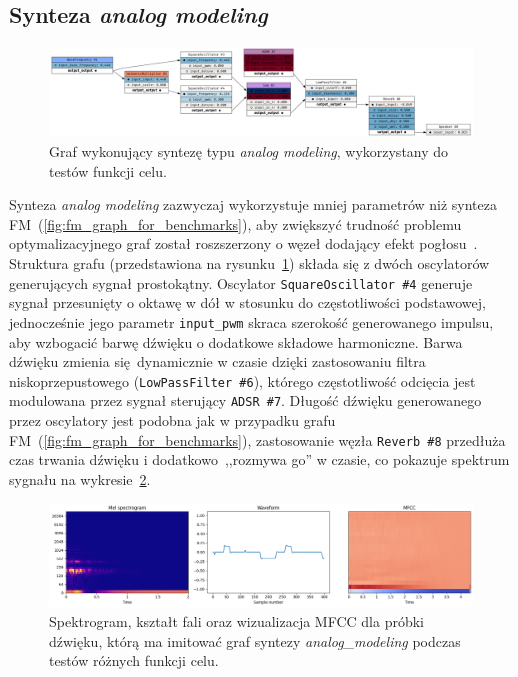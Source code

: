 \subsection{Synteza \textit{analog modeling}}

\begin{figure}[H]
    \centering
    \includegraphics[width=1.0\linewidth]{rys03/analog_graph_for_benchmarks.png}
    \caption{
      Graf wykonujący syntezę typu \textit{analog modeling}, wykorzystany do testów funkcji celu.
    }\label{fig:analog_graph_for_benchmarks}
\end{figure}

Synteza \textit{analog modeling} zazwyczaj wykorzystuje mniej parametrów niż synteza
FM~(\ref{fig:fm_graph_for_benchmarks}), aby zwiększyć trudność problemu optymalizacyjnego
graf został roszszerzony o węzeł dodający efekt pogłosu~\cite{reverb}.
Struktura grafu (przedstawiona na rysunku~\ref{fig:analog_graph_for_benchmarks}) składa
się z dwóch oscylatorów generujących sygnał prostokątny. Oscylator \texttt{SquareOscillator \#4}
generuje sygnał przesunięty o oktawę w dół w stosunku do częstotliwości podstawowej, jednocześnie
jego parametr \texttt{input\_pwm} skraca szerokość generowanego impulsu, aby wzbogacić barwę dźwięku
o dodatkowe składowe harmoniczne. Barwa dźwięku zmienia się dynamicznie w czasie dzięki 
zastosowaniu filtra niskoprzepustowego (\texttt{LowPassFilter \#6}), którego
częstotliwość odcięcia jest modulowana przez sygnał sterujący \texttt{ADSR \#7}.
Długość dźwięku generowanego przez oscylatory jest podobna jak w przypadku
grafu FM~(\ref{fig:fm_graph_for_benchmarks}), zastosowanie węzła \texttt{Reverb \#8}
przedłuża czas trwania dźwięku i dodatkowo~,,rozmywa go'' w czasie, co pokazuje
spektrum sygnału na wykresie~\ref{fig:am_training_sample_overview}.

\begin{figure}[H]
  \centering
  \includegraphics[width=1.0\linewidth]{rys03/am_training_sample_overview.png}
  \caption{
    Spektrogram, kształt fali oraz wizualizacja MFCC dla próbki dźwięku, którą
    ma imitować graf syntezy \textit{analog\_modeling} podczas testów różnych funkcji celu.
  }\label{fig:am_training_sample_overview}
\end{figure}



